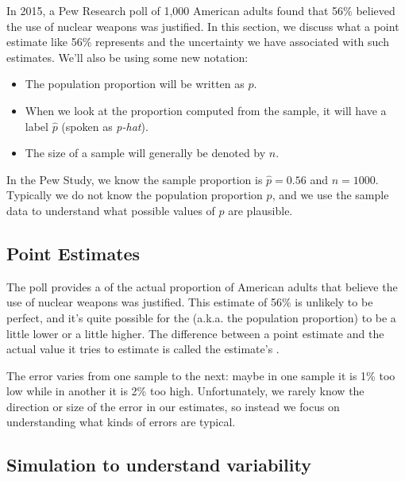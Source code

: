 In 2015, a Pew Research poll of 1,000 American adults found that
56\% believed the use of nuclear weapons was justified.
In this section, we discuss what a point estimate like 56\% represents
and the uncertainty we have associated with such estimates. We'll also
be using some new notation:
\begin{itemize}
\item The population proportion will be written as $p$.
\item When we look at the proportion computed from the sample,
    it will have a label $\hat{p}$ (spoken as \emph{p-hat}).
\item The size of a sample will generally be denoted by $n$.
\end{itemize}
In the Pew Study, we know the sample proportion is
$\hat{p} = 0.56$ and $n = 1000$. Typically we do not know the
population proportion $p$, and we use the sample data to
understand what possible values of $p$ are plausible.

\subsection{Point Estimates}
\label{pointEstimates}


The poll provides a  of the actual proportion
of American adults that believe the use of nuclear weapons was
justified. This estimate of 56\% is unlikely to be perfect, and
it's quite possible for the 
(a.k.a. the population proportion) to be a little lower
or a little higher. The difference between a point estimate and
the actual value it tries to estimate is called the estimate's
.

The error varies from one sample to the next: maybe
in one sample it is 1\% too low while in another
it is 2\% too high. Unfortunately, we rarely know the direction
or size of the error in our estimates, so instead we focus
on understanding what kinds of errors are typical.


\subsection{Simulation to understand variability}
\label{simulationForUnderstandingVariabilitySection}

